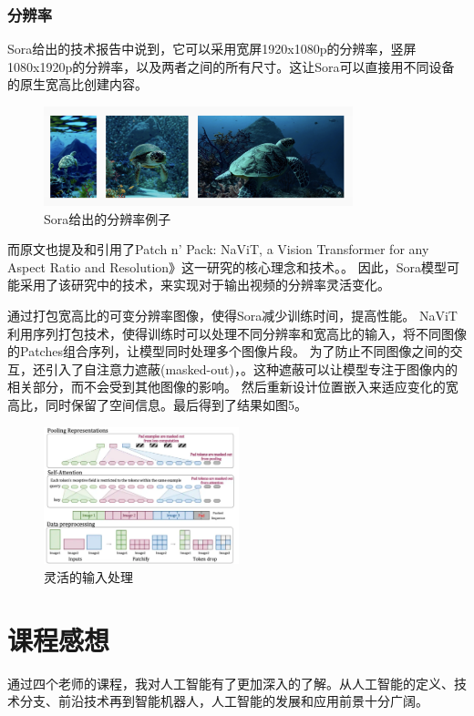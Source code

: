 \documentclass[12pt,a4paper,oneside]{article}
\begin{document}
\subsubsection{分辨率}
Sora给出的技术报告中说到，它可以采用宽屏1920x1080p的分辨率，竖屏1080x1920p的分辨率，以及两者之间的所有尺寸。这让Sora可以直接用不同设备的原生宽高比创建内容。
\begin{figure}[htbp] 
    \centering 
    \includegraphics[width=0.8\textwidth]{5.png} 
    \caption{Sora给出的分辨率例子} 
    \label{Fig.main5} 
\end{figure}

而原文也提及和引用了Patch n’ Pack: NaViT, a Vision Transformer for any Aspect Ratio and Resolution》这一研究的核心理念和技术。。
因此，Sora模型可能采用了该研究中的技术，来实现对于输出视频的分辨率灵活变化。

通过打包宽高比的可变分辨率图像，使得Sora减少训练时间，提高性能。
NaViT利用序列打包技术，使得训练时可以处理不同分辨率和宽高比的输入，将不同图像的Patches组合序列，让模型同时处理多个图像片段。
为了防止不同图像之间的交互，还引入了自注意力遮蔽(masked-out)，。这种遮蔽可以让模型专注于图像内的相关部分，而不会受到其他图像的影响。
然后重新设计位置嵌入来适应变化的宽高比，同时保留了空间信息。最后得到了结果如图5。
\begin{figure}[htbp] 
    \centering 
    \includegraphics[width=0.505\textwidth]{6.png} 
    \caption{灵活的输入处理} 
    \label{Fig.main6} 
\end{figure}


\section{课程感想}
通过四个老师的课程，我对人工智能有了更加深入的了解。从人工智能的定义、技术分支、前沿技术再到智能机器人，人工智能的发展和应用前景十分广阔。
\end{document}
